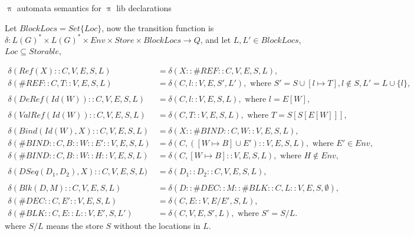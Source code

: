 \documentclass{beamer}
\begin{document}
\begin{frame}{{\color{red}$\uppi$ automata} semantics for {\color{red}$\uppi$ lib} declarations}

Let $\mathit{BlockLocs} = \mathit{Set}\{\mathit{Loc}\}$, now the transition function is $\delta : L(G)^* \times L(G)^* \times Env \times Store \times \mathit{BlockLocs} \to Q$, and let $L, L' \in \mathit{BlockLocs}$, $\mathit{Loc} \subseteq \mathit{Storable}$,
\begin{tiny}
\begin{align}
\delta(Ref(X) :: C, V, E, S, L) & = \delta(X :: \#REF :: C, V, E, S, L), \\
\delta(\#REF :: C, T :: V, E, S, L) & = \delta(C, l :: V, E, S', L'), \text{ where } S' = S \cup [l \mapsto T], l \not\in S, L' = L \cup \{l\}, \\ \\
\delta(DeRef(Id(W)) :: C, V, E, S, L) & = \delta(C, l :: V, E, S, L), \text{ where } l = E[W],  \\ \\
\delta(ValRef(Id(W)) :: C, V, E, S, L) & = \delta(C, T :: V, E, S, L), \text{ where } T = S[S[E[W]]],  \\ \\
\delta(Bind(Id(W), X) :: C, V, E, S, L) &= \delta(X :: \#BIND :: C, W :: V, E, S, L), \\
\delta(\#BIND :: C, B :: W :: E' :: V, E, S, L) &= \delta(C, ([W \mapsto B] \cup E') :: V, E, S, L), \text{ where } E' \in \mathit{Env},\\
\delta(\#BIND :: C, B :: W :: H :: V, E, S, L) &= \delta(C, [W \mapsto B] :: V, E, S, L), \text{ where } H \not\in \mathit{Env},  \\ \\
\delta(DSeq(D_1, D_2), X) :: C, V, E, S, L) &= \delta(D_1 :: D_2 :: C, V, E, S, L), \\ \\
\delta(Blk(D, M) :: C, V, E, S, L) &= \delta(D :: \#DEC :: M :: \#BLK :: C, L :: V, E, S, \emptyset), \\
\delta(\#DEC :: C, E' :: V, E, S, L) &= \delta(C, E :: V, E / E', S, L), \\
\delta(\#BLK :: C, E :: L :: V, E', S, L') &= \delta(C, V, E, S', L), \text{ where } S' = S / L.
\end{align}
where $S / L$ means the store $S$ without the locations in $L$. 
\end{tiny}

\end{frame}
\end{document}
